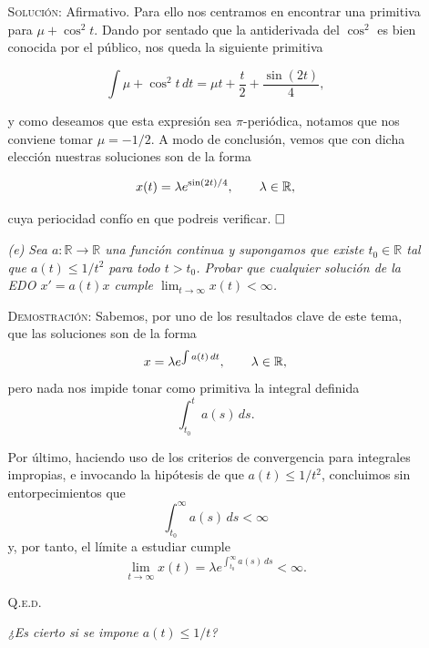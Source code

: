 \documentclass{article}
\begin{document}
\begin{enumerate}
\begin{enumerate}
        \vspace{7px}

        \textsc{Solución}: Afirmativo. Para ello nos centramos en encontrar una primitiva para $\mu + \cos^2t$. Dando por sentado que la antiderivada del $\cos^2$ es bien conocida por el público, nos queda la siguiente primitiva

        \[\int \mu + \cos^2t\,dt = \mu t + \frac{t}{2} + \frac{\sin(2t)}{4},\]

        y como deseamos que esta expresión sea $\pi$-periódica, notamos que nos conviene tomar $\mu = -1/2$. A modo de conclusión, vemos que con dicha elección nuestras soluciones son de la forma

        \[x(t) = \lambda e^{\sin(2t)/4}, \hspace{20px} \lambda \in \mathbb{R},\]

        cuya periocidad confío en que podreis verificar. $\hfill\square$

        \vspace{7px}

        \item[\textit{(e)}] \textit{Sea $a : \mathbb{R} \rightarrow \mathbb{R}$ una función continua y supongamos que existe $t_0 \in \mathbb{R}$ tal que $a(t) \leq 1/t^2$ para todo $t > t_0$. Probar que cualquier solución de la EDO $x' = a(t)x$ cumple $\lim_{t \to \infty} x(t) < \infty$.}

        \vspace{7px}

        \textsc{Demostración}: Sabemos, por uno de los resultados clave de este tema, que las soluciones son de la forma \[x = \lambda e ^{\int a(t)\,dt}, \hspace{20px} \lambda \in \mathbb{R},\] pero nada nos impide tonar como primitiva la integral definida \[\int_{t_0}^{t} a(s)\, ds.\]

        Por último, haciendo uso de los criterios de convergencia para integrales impropias, e invocando la hipótesis de que $a(t) \leq 1/t^2$, concluimos sin entorpecimientos que \[\int_{t_0}^{\infty} a(s)\,ds < \infty\] y, por tanto, el límite a estudiar cumple \[\lim_{t \to \infty} x(t) = \lambda e^{\int_{t_0}^{\infty} a(s)\,ds} < \infty.\]

        \hfill{\textsc{Q.e.d.}}

        \vspace{7px}

        \textit{¿Es cierto si se impone $a(t) \leq 1/t$?}


\end{enumerate}
\end{enumerate}
\end{document}
